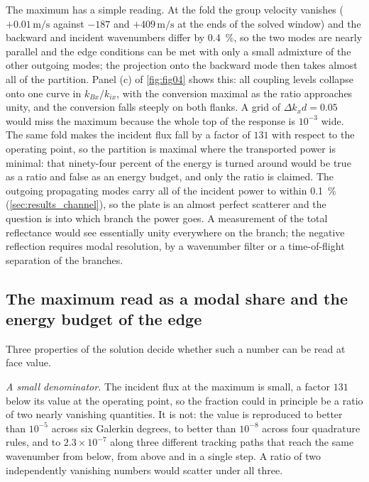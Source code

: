 The maximum has a simple reading.  At the fold the group velocity vanishes ($+0.01\,\si{\metre\per\second}$ against $-187$ and $+409\,\si{\metre\per\second}$ at the ends of the solved window) and the backward and incident wavenumbers differ by \SI{0.4}{\percent}, so the two modes are nearly parallel and the edge conditions can be met with only a small admixture of the other outgoing modes; the projection onto the backward mode then takes almost all of the partition.  Panel (c) of \cref{fig:fig04} shows this: all coupling levels collapse onto one curve in $k_{Bx}/k_{ix}$, with the conversion maximal as the ratio approaches unity, and the conversion falls steeply on both flanks.  A grid of $\Delta k_xd=0.05$ would miss the maximum because the whole top of the response is $10^{-3}$ wide.  The same fold makes the incident flux fall by a factor of $131$ with respect to the operating point, so the partition is maximal where the transported power is minimal: that ninety-four percent of the energy is turned around would be true as a ratio and false as an energy budget, and only the ratio is claimed.  The outgoing propagating modes carry all of the incident power to within \SI{0.1}{\percent} (\cref{sec:results_channel}), so the plate is an almost perfect scatterer and the question is into which branch the power goes.  A measurement of the total reflectance would see essentially unity everywhere on the branch; the negative reflection requires modal resolution, by a wavenumber filter or a time-of-flight separation of the branches.

\subsection{The maximum read as a modal share and the energy budget of the edge}
\label{sec:results_artefact}
\label{sec:results_channel}

Three properties of the solution decide whether such a number can be read at
face value.

\emph{A small denominator.}  The incident flux at the maximum is small, a
factor $131$ below its value at the operating point, so the fraction could in
principle be a ratio of two nearly vanishing quantities.  It is not: the value
is reproduced to better than $10^{-5}$ across six Galerkin degrees, to
better than $10^{-8}$ across four quadrature rules, and to $2.3\times10^{-7}$ along three
different tracking paths that reach the same wavenumber from below, from above
and in a single step.  A ratio of two independently vanishing numbers would
scatter under all three.

